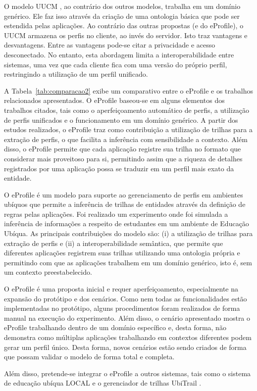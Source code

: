 \documentclass[times, 10pt, twocolumn]{article}
\begin{document}
O modelo UUCM \cite{niederee04}, ao contrário dos outros modelos, trabalha em um domínio genérico. Ele faz isso através da criação de uma ontologia básica que pode ser estendida pelas aplicações. Ao contrário das outras propostas (e do eProfile), o UUCM armazena os perfis no cliente, ao invés do servidor. Isto traz vantagens e desvantagens. Entre as vantagens pode-se citar a privacidade e acesso desconectado. No entanto, esta abordagem limita a interoperabilidade entre sistemas, uma vez que cada cliente fica com uma versão do próprio perfil, restringindo a utilização de um perfil unificado.

A Tabela~\ref{tab:comparacao2} exibe um comparativo entre o eProfile e os trabalhos relacionados apresentados. O eProfile baseou-se em alguns elementos dos trabalhos citados, tais como o aperfeiçoamento automático de perfis, a utilização de perfis unificados e o funcionamento em um domínio genérico. A partir dos estudos realizados, o eProfile traz como contribuição a utilização de trilhas para a extração de perfis, o que facilita a inferência com sensibilidade a contexto. Além disso, o eProfile permite que cada aplicação registre sua trilha no formato que considerar mais proveitoso para si, permitindo assim que a riqueza de detalhes registrados por uma aplicação possa se traduzir em um perfil mais exato da entidade.

\label{sec:conclusao}

O eProfile é um modelo para suporte ao gerenciamento de perfis em ambientes ubíquos que permite a inferência de trilhas de entidades através da definição de regras pelas aplicações. Foi realizado um experimento onde foi simulada a inferência de informações a respeito de estudantes em um ambiente de Educação Ubíqua. As principais contribuições do modelo são: (i) a utilização de trilhas para extração de perfis e (ii) a interoperabilidade semântica, que permite que diferentes aplicações registrem suas trilhas utilizando uma ontologia própria e permitindo com que as aplicações trabalhem em um domínio genérico, isto é, sem um contexto preestabelecido.

O eProfile é uma proposta inicial e requer aperfeiçoamento, especialmente na expansão do protótipo e dos cenários. Como nem todas as funcionalidades estão implementadas no protótipo, alguns procedimentos foram realizados de forma manual na execução do experimento. Além disso, o cenário apresentado mostra o eProfile trabalhando dentro de um domínio específico e, desta forma, não demonstra como múltiplas aplicações trabalhando em contextos diferentes podem gerar um perfil único. Desta forma, novos cenários estão sendo criados de forma que possam validar o modelo de forma total e completa.

Além disso, pretende-se integrar o eProfile a outros sistemas, tais como o sistema de educação ubíqua LOCAL \cite{barbosa08} e o gerenciador de trilhas UbiTrail \cite{silva09}.



\end{document}
